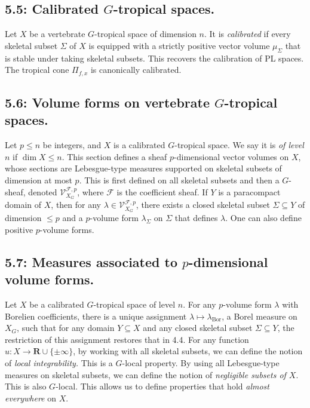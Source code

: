 \documentclass[12pt,reqno]{amsart}
\theoremstyle{definition}
\theoremstyle{remark}
\theoremstyle{citedrem}
\theoremstyle{cited}
\theoremstyle{citeddef}
\theoremstyle{step}
\begin{document}
\subsection*{5.5: Calibrated $G$-tropical spaces.}
Let $X$ be a vertebrate $G$-tropical space of dimension $n$. It is \emph{calibrated} if every skeletal subset $\Sigma$ of $X$ is equipped with a strictly positive vector volume $\mu_\Sigma$ that is stable under taking skeletal subsets. This recovers the calibration of PL spaces. The tropical cone $\Pi_{f,x}$ is canonically calibrated. 

\subsection*{5.6: Volume forms on vertebrate $G$-tropical spaces.} Let $p \leq n$ be integers, and $X$ is a calibrated $G$-tropical space. We say it is \emph{of level $n$} if $\dim{X} \leq n$. This section defines a sheaf $p$-dimensional vector volumes on $X$, whose sections are Lebesgue-type measures supported on skeletal subsets of dimension at most $p$. This is first defined on all skeletal subsets and then a $G$-sheaf, denoted $\mathcal{V}_{X_G}^{\mathcal{F}, p}$, where $\mathcal{F}$ is the coefficient sheaf. If $Y$ is a paracompact domain of $X$, then for any $\lambda \in \mathcal{V}_{X_G}^{\mathcal{F}, p}$, there exists a closed skeletal subset $\Sigma \subseteq Y$ of dimension $\leq p$ and a $p$-volume form $\lambda_{\Sigma}$ on $\Sigma$ that defines $\lambda$. One can also define positive $p$-volume forms. 

\subsection*{5.7: Measures associated to $p$-dimensional volume forms.}
Let $X$ be a calibrated $G$-tropical space of level $n$. For any $p$-volume form $\lambda$ with Borelien coefficients, there is a unique assignment $\lambda \mapsto \lambda_{\mathrm{Bor}}$, a Borel measure on $X_G$, such that for any domain $Y \subseteq X$ and any closed skeletal subset $\Sigma \subseteq Y$, the restriction of this assignment restores that in 4.4. For any function $u \colon X \to \mathbf{R} \cup \{\pm \infty\}$, by working with all skeletal subsets, we can define the notion of \emph{local integrability.} This is a $G$-local property. By using all Lebesgue-type measures on skeletal subsets, we can define the notion of \emph{negligible subsets of $X$}. This is also $G$-local. This allows us to define properties that hold \emph{almost everywhere} on $X$. 
\end{document}
